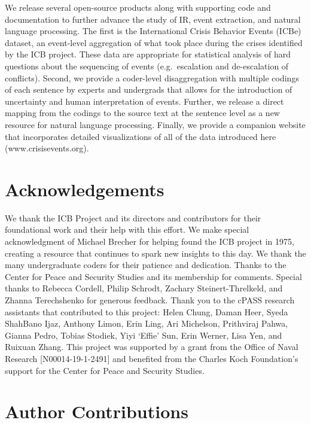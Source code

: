 \documentclass{article}
\begin{document}
We release several open-source products along with supporting code and
documentation to further advance the study of IR, event extraction, and
natural language processing. The first is the International Crisis
Behavior Events (ICBe) dataset, an event-level aggregation of what took
place during the crises identified by the ICB project. These data are
appropriate for statistical analysis of hard questions about the
sequencing of events (e.g.~escalation and de-escalation of conflicts).
Second, we provide a coder-level disaggregation with multiple codings of
each sentence by experts and undergrads that allows for the introduction
of uncertainty and human interpretation of events. Further, we release a
direct mapping from the codings to the source text at the sentence level
as a new resource for natural language processing. Finally, we provide a
companion website that incorporates detailed visualizations of all of
the data introduced here (www.crisisevents.org).

\hypertarget{format}{%
\section*{Acknowledgements}\label{format}}

We thank the ICB Project and its directors and contributors for their
foundational work and their help with this effort. We make special
acknowledgment of Michael Brecher for helping found the ICB project in
1975, creating a resource that continues to spark new insights to this
day. We thank the many undergraduate coders for their patience and
dedication. Thanks to the Center for Peace and Security Studies and its
membership for comments. Special thanks to Rebecca Cordell, Philip
Schrodt, Zachary Steinert-Threlkeld, and Zhanna Terechshenko for
generous feedback. Thank you to the cPASS research assistants that
contributed to this project: Helen Chung, Daman Heer, Syeda ShahBano
Ijaz, Anthony Limon, Erin Ling, Ari Michelson, Prithviraj Pahwa, Gianna
Pedro, Tobias Stodiek, Yiyi `Effie' Sun, Erin Werner, Lisa Yen, and
Ruixuan Zhang. This project was supported by a grant from the Office of
Naval Research {[}N00014-19-1-2491{]} and benefited from the Charles
Koch Foundation's support for the Center for Peace and Security Studies.

\hypertarget{format}{%
\section*{Author Contributions}\label{format}}
\end{document}
